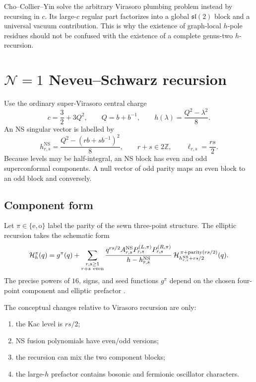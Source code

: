 \documentclass[11pt]{article}
\newcommand{\NS}{\mathrm{NS}}
\newcommand{\Hh}{\mathcal H}
\begin{document}
Cho--Collier--Yin solve the arbitrary Virasoro plumbing problem instead by
recursing in \(c\).  Its large-\(c\) regular part factorizes into a global
\(\mathfrak{sl}(2)\) block and a universal vacuum contribution.  This is why
the existence of graph-local \(h\)-pole residues should not be confused with
the existence of a complete genus-two \(h\)-recursion.

\section{\texorpdfstring{\(\mathcal N=1\) Neveu--Schwarz recursion}
{N=1 Neveu--Schwarz recursion}}
\label{sec:ns-recursion}

Use the ordinary super-Virasoro central charge
\begin{equation}
 c=\frac32+3Q^2,\qquad Q=b+b^{-1},
\qquad h(\lambda)=\frac{Q^2-\lambda^2}{8}.
 \label{eq:ns-parameterization}
\end{equation}
An NS singular vector is labelled by
\begin{equation}
 h^{\NS}_{r,s}
 =
 \frac{Q^2-(rb+s b^{-1})^2}{8},
 \qquad r+s\in2\mathbb Z,
 \qquad
 \ell_{r,s}=\frac{rs}{2}.
 \label{eq:ns-kac-weight}
\end{equation}
Because levels may be half-integral, an NS block has even and odd
superconformal components.  A null vector of odd parity maps an even block
to an odd block and conversely.

\subsection{Component form}

Let \(\pi\in\{\mathrm e,\mathrm o\}\) label the parity of the sewn
three-point structure.  The elliptic recursion takes the schematic form
\begin{equation}
 \Hh_h^\pi(q)
 =
 g^\pi(q)
 +
 \sum_{\substack{r,s\ge1\\r+s\ {\rm even}}}
 \frac{q^{rs/2}
 A^{\NS}_{r,s}
 P_{r,s}^{(L,\pi)}
 P_{r,s}^{(R,\pi)}}
 {h-h^{\NS}_{r,s}}\,
 \Hh_{h^{\NS}_{r,s}+rs/2}^{\,\pi+\mathrm{parity}(rs/2)}(q).
 \label{eq:ns-schematic-recursion}
\end{equation}
The precise powers of \(16\), signs, and seed functions \(g^\pi\) depend on
the chosen four-point component and elliptic prefactor
\cite{HadaszJaskolskiSuchanek2007NSBlocks,Suchanek2011EllipticRecursion}.

The conceptual changes relative to Virasoro recursion are only:
\begin{enumerate}
 \item the Kac level is \(rs/2\);
 \item NS fusion polynomials have even/odd versions;
 \item the recursion can mix the two component blocks;
 \item the large-\(h\) prefactor contains bosonic and fermionic oscillator
 characters.
\end{enumerate}
\end{document}
